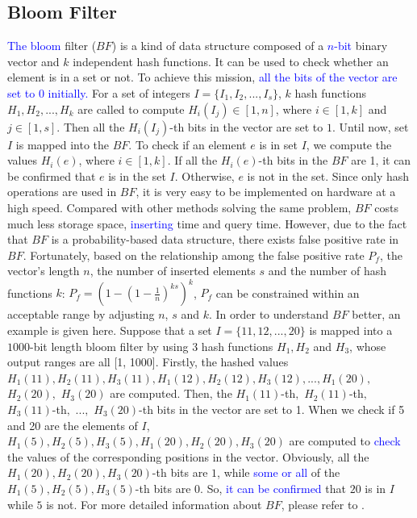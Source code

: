 \documentclass[IEEE JOURNAL OF BIOMEDICAL AND HEALTH INFORMATICS]{IEEEtran}
\begin{document}
{\subsection{Bloom Filter}
\textcolor{blue}{The bloom} filter ($BF$) \cite{bloomfilter1970} is a kind of data structure composed of a \textcolor{blue}{$n$-bit} binary vector and $k$ independent hash functions. It can be used to check whether an element is in a set or not. To achieve this mission, \textcolor{blue}{all the bits of the vector are set to $0$ initially.} For a set of integers $I=\{I_1, I_2, ... ,I_s\}$, $k$ hash functions $H_1, H_2, ... , H_k$ are called to compute $H_i(I_j) \in [1, n]$, where $i\in [1, k]$ and $j\in[1, s]$. Then all the $H_i(I_j)$-th bits in the vector are set to $1$. Until now, set $I$ is mapped into the $BF$. To check if an element $e$ is in set $I$, we compute the values $H_i(e)$, where $i\in[1, k]$. If all the $H_i(e)$-th bits in the $BF$ are 1, it can be confirmed that $e$ is in the set $I$. Otherwise, $e$ is not in the set. Since only hash operations are used in $BF$, it is very easy to be implemented on hardware at a high speed. Compared with other methods solving the same problem, $BF$ costs much less storage space, \textcolor{blue}{inserting} time and query time. However, due to the fact that $BF$ is a probability-based data structure, there exists false positive rate in $BF$. Fortunately, based on the relationship among the false positive rate $P_f$, the vector's length $n$, the number of inserted elements $s$ and the number of hash functions $k$: $P_f=(1-(1-\frac{1}{n})^{ks})^k$, $P_f$ can be constrained within an acceptable range by adjusting $n$, $s$ and $k$. In order to understand $BF$ better, an example is given here. Suppose that a set $I = \{11, 12, ..., 20 \}$ is mapped into a $1000$-bit length bloom filter by using 3 hash functions $H_1, H_2$ and $H_3$, whose output ranges are all [1, 1000]. Firstly, the hashed values $H_1(11), H_2(11), H_3(11), H_1(12), H_2(12), H_3(12), ... , H_1(20),$ $H_2(20),$ $H_3(20)$ are computed. Then, the $H_1(11)$-th$,$ $H_2(11)$-th$,$ $H_3(11)$-th$,$ $... ,$ $H_3(20)$-th bits in the vector are set to 1. When we check if 5 and 20 are the elements of $I$, $H_1(5), H_2(5), H_3(5), H_1(20), H_2(20), H_3(20)$ are computed to \textcolor{blue}{check} the values of the corresponding positions in the vector. Obviously, all the $H_1(20), H_2(20), H_3(20)$-th bits are $1$, while \textcolor{blue}{some or all} of the $H_1(5), H_2(5), H_3(5)$-th bits are $0$. So, \textcolor{blue}{it can be confirmed} that $20$ is in $I$ while $5$ is not. For more detailed information about $BF$, please refer to \cite{bloomfilter1970}.	

}
\end{document}
